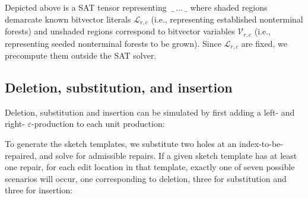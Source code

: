 \documentclass[sigplan,nonacm]{acmart}\settopmatter{printfolios=false,printccs=false,printacmref=false}
\begin{document}
\noindent Depicted above is a SAT tensor representing $\:\_\:\ldots\:\_$ where shaded regions demarcate known bitvector literals $\mathcal{L}_{r,c}$ (i.e., representing established nonterminal forests) and unshaded regions correspond to bitvector variables $\mathcal{V}_{r,c}$ (i.e., representing seeded nonterminal forests to be grown). Since $\mathcal{L}_{r,c}$ are fixed, we precompute them outside the SAT solver.

\subsection{Deletion, substitution, and insertion}\label{sec:dsi}

Deletion, substitution and insertion can be simulated by first adding a left- and right- $\varepsilon$-production to each unit production:\vspace{5pt}

\begin{prooftree}
\end{prooftree}

\begin{prooftree}
\end{prooftree}

\noindent To generate the sketch templates, we substitute two holes at an index-to-be-repaired, and solve for admissible repairs. If a given sketch template has at least one repair, for each edit location in that template, exactly one of seven possible scenarios will occur, one corresponding to deletion, three for substitution and three for insertion:
\end{document}

